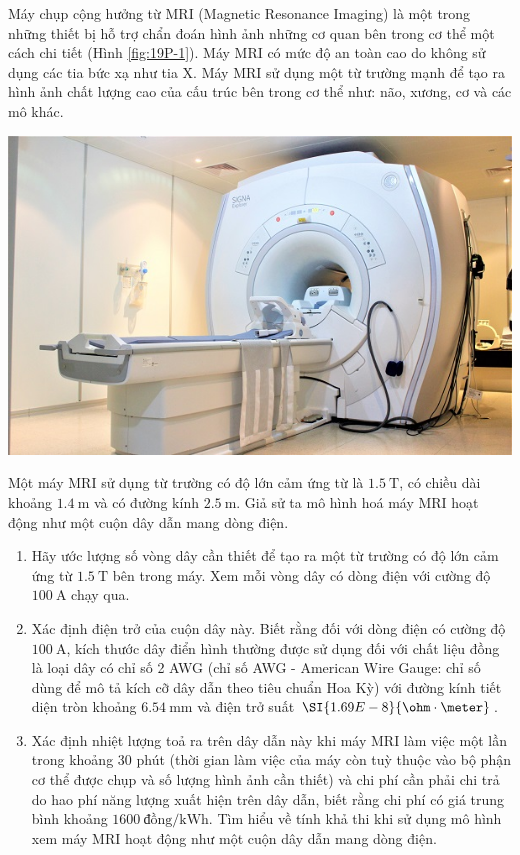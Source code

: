 \begin{ex}
	Máy chụp cộng hưởng từ MRI (Magnetic Resonance Imaging) là một trong những thiết bị hỗ trợ chẩn đoán hình ảnh những cơ quan bên trong cơ thể một cách chi tiết (Hình \ref{fig:19P-1}). Máy MRI có mức độ an toàn cao do không sử dụng các tia bức xạ như tia X. Máy MRI sử dụng một từ trường mạnh để tạo ra hình ảnh chất lượng cao của cấu trúc bên trong cơ thể như: não, xương, cơ và các mô khác.
	\begin{center}
		\includegraphics[width=0.4\linewidth]{figs/VN12-Y24-PH-SYL-019P-1}
		\label{fig:19P-1}
	\end{center} 
	Một máy MRI sử dụng từ trường có độ lớn cảm ứng từ là $\SI{1.5}{\tesla}$, có chiều dài khoảng $\SI{1.4}{\meter}$ và có đường kính $\SI{2.5}{\meter}$. Giả sử ta mô hình hoá máy MRI hoạt động như một cuộn dây dẫn mang dòng điện.
	\begin{enumerate}[label=\alph*)]
		\item Hãy ước lượng số vòng dây cần thiết để tạo ra một từ trường có độ lớn cảm ứng từ $\SI{1.5}{\tesla}$ bên trong máy. Xem mỗi vòng dây có dòng điện với cường độ $\SI{100}{\ampere}$ chạy qua.
		\item Xác định điện trở của cuộn dây này. Biết rằng đối với dòng điện có cường độ $\SI{100}{\ampere}$, kích thước dây điển hình thường được sử dụng đối với chất liệu đồng là loại dây có chỉ số 2 AWG (chỉ số AWG - American Wire Gauge: chỉ số dùng để mô tả kích cỡ dây dẫn theo tiêu chuẩn Hoa Kỳ) với đường kính tiết diện tròn khoảng $\SI{6.54}{\milli\meter}$ và điện trở suất $\SI{1.69E-8}{\ohm\cdot\meter}$.
		\item Xác định nhiệt lượng toả ra trên dây dẫn này khi máy MRI làm việc một lần trong khoảng 30 phút (thời gian làm việc của máy còn tuỳ thuộc vào bộ phận cơ thể được chụp và số lượng hình ảnh cần thiết) và chi phí cần phải chi trả do hao phí năng lượng xuất hiện trên dây dẫn, biết rằng chi phí có giá trung bình khoảng $\SI{1600}{\text{đồng}/\kilo\watt\hour}$. Tìm hiểu về tính khả thi khi sử dụng mô hình xem máy MRI hoạt động như một cuộn dây dẫn mang dòng điện.
	\end{enumerate}

\end{ex}
